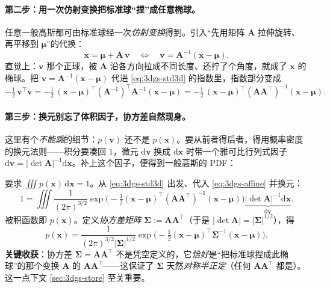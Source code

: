\paragraph{第二步：用一次仿射变换把标准球“捏”成任意椭球。}
任意一般高斯都可由标准球经一次\emph{仿射变换}得到。引入“先用矩阵 $\mathbf A$ 拉伸旋转、再平移到 $\boldsymbol\mu$”的代换：
\begin{equation}
  \mathbf x=\boldsymbol\mu+\mathbf A\,\mathbf v
  \quad\Longleftrightarrow\quad
  \mathbf v=\mathbf A^{-1}(\mathbf x-\boldsymbol\mu).
  \label{eq:3dgs-affine}
\end{equation}
直觉上：$\mathbf v$ 那个正球，被 $\mathbf A$ 沿各方向拉成不同长度、还拧了个角度，就成了 $\mathbf x$ 的椭球。把 $\mathbf v=\mathbf A^{-1}(\mathbf x-\boldsymbol\mu)$ 代进 \cref{eq:3dgs-std3d} 的指数里，指数部分变成
\begin{equation*}
  -\tfrac12\,\mathbf v^\top\mathbf v
  =-\tfrac12\,(\mathbf x-\boldsymbol\mu)^\top(\mathbf A^{-1})^\top\mathbf A^{-1}(\mathbf x-\boldsymbol\mu)
  =-\tfrac12\,(\mathbf x-\boldsymbol\mu)^\top(\mathbf A\mathbf A^\top)^{-1}(\mathbf x-\boldsymbol\mu).
\end{equation*}

\paragraph{第三步：换元别忘了体积因子，协方差自然现身。}
这里有个\emph{不能跳}的细节：$p(\mathbf v)$ 还不是 $p(\mathbf x)$。要从前者得后者，得用概率密度的换元法则——积分要凑回 $1$，微元 $\mathrm d\mathbf v$ 换成 $\mathrm d\mathbf x$ 时带一个雅可比行列式因子 $\mathrm d\mathbf v=|\det\mathbf A|^{-1}\mathrm d\mathbf x$。补上这个因子，便得到一般高斯的 PDF：

\begin{derivation}
要求 $\iiint p(\mathbf x)\,\mathrm d\mathbf x=1$。从 \cref{eq:3dgs-std3d} 出发、代入 \cref{eq:3dgs-affine} 并换元：
\[
1=\iiint\frac{1}{(2\pi)^{3/2}}\exp\!\Big(-\tfrac12(\mathbf x-\boldsymbol\mu)^\top(\mathbf A\mathbf A^\top)^{-1}(\mathbf x-\boldsymbol\mu)\Big)\underbrace{|\det\mathbf A|^{-1}\mathrm d\mathbf x}_{\mathrm d\mathbf v}.
\]
被积函数即 $p(\mathbf x)$。定义\emph{协方差矩阵} $\boldsymbol\Sigma:=\mathbf A\mathbf A^\top$（于是 $|\det\mathbf A|=|\boldsymbol\Sigma|^{1/2}$），得
\[
p(\mathbf x)=\frac{1}{(2\pi)^{3/2}|\boldsymbol\Sigma|^{1/2}}\exp\!\Big(-\tfrac12(\mathbf x-\boldsymbol\mu)^\top\boldsymbol\Sigma^{-1}(\mathbf x-\boldsymbol\mu)\Big).
\]
\textbf{关键收获}：协方差 $\boldsymbol\Sigma=\mathbf A\mathbf A^\top$ 不是凭空定义的，它\emph{恰好}是“把标准球捏成此椭球”的那个变换 $\mathbf A$ 的 $\mathbf A\mathbf A^\top$——这保证了 $\boldsymbol\Sigma$ 天然\emph{对称半正定}（任何 $\mathbf A\mathbf A^\top$ 都是）。这一点下文 \cref{sec:3dgs-store} 至关重要。
\end{derivation}

